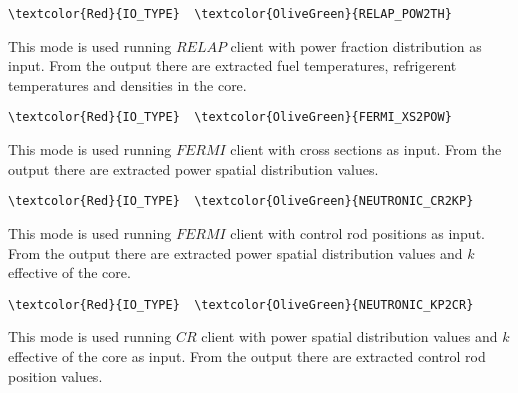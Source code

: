 \begin{Verbatim}[frame=single,commandchars=\\\{\}]
\textcolor{Red}{IO_TYPE}  \textcolor{OliveGreen}{RELAP_POW2TH}
\end{Verbatim}
This mode is used running $RELAP$ client with power fraction distribution as input. From the output there are extracted fuel temperatures, refrigerent temperatures and densities in the core.

\begin{Verbatim}[frame=single,commandchars=\\\{\}]
\textcolor{Red}{IO_TYPE}  \textcolor{OliveGreen}{FERMI_XS2POW}
\end{Verbatim}
This mode is used running $FERMI$ client with cross sections as input. From the output there are extracted power spatial distribution values.

\begin{Verbatim}[frame=single,commandchars=\\\{\}]
\textcolor{Red}{IO_TYPE}  \textcolor{OliveGreen}{NEUTRONIC_CR2KP}
\end{Verbatim}
This mode is used running $FERMI$ client with control rod positions as input. From the output there are extracted power spatial distribution values and $k$ effective of the core.

\begin{Verbatim}[frame=single,commandchars=\\\{\}]
\textcolor{Red}{IO_TYPE}  \textcolor{OliveGreen}{NEUTRONIC_KP2CR}
\end{Verbatim}
This mode is used running $CR$ client with power spatial distribution values and $k$ effective of the core as input. From the output there are extracted control rod position values.



 


